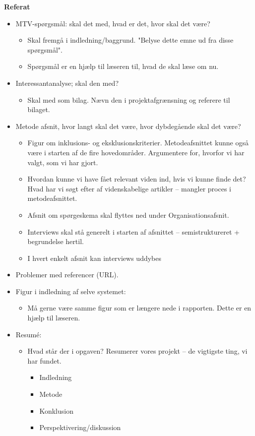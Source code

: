 \textbf{Referat}
\begin{itemize}
\item MTV-spørgsmål: skal det med, hvad er det, hvor skal det være?
\begin{itemize}
\item Skal fremgå i indledning/baggrund. "Belyse dette emne ud fra disse spørgsmål".
\item Spørgsmål er en hjælp til læseren til, hvad de skal læse om nu. 
\end{itemize}
\item Interessantanalyse; skal den med?
\begin{itemize}
\item Skal med som bilag. Nævn den i projektafgrænsning og referere til bilaget. 
\end{itemize}
\item Metode afsnit, hvor langt skal det være, hvor dybdegående skal det være?
\begin{itemize}
\item Figur om inklusions- og eksklusionskriterier. Metodeafsnittet kunne også være i starten af de fire hovedområder. Argumentere for, hvorfor vi har valgt, som vi har gjort. 
\item Hvordan kunne vi have fået relevant viden ind, hvis vi kunne finde det? Hvad har vi søgt efter af videnskabelige artikler – mangler proces i metodeafsnittet. 
\item Afsnit om spørgeskema skal flyttes ned under Organisationsafsnit. 
\item Interviews skal stå generelt i starten af afsnittet – semistruktureret + begrundelse hertil. 
\item I hvert enkelt afsnit kan interviews uddybes
\end{itemize}
\end{itemize}
\begin{itemize}
\item Problemer med referencer (URL).
\item Figur i indledning af selve systemet:
\begin{itemize}
\item Må gerne være samme figur som er længere nede i rapporten. Dette er en hjælp til læseren. 
\end{itemize}
\item Resumé:
\begin{itemize}
\item Hvad står der i opgaven? Resumerer vores projekt – de vigtigste ting, vi har fundet. 
\begin{itemize}
\item Indledning
\item Metode
\item Konklusion 
\item Perspektivering/diskussion
\end{itemize}
\end{itemize}
\end{itemize}

\newpage


